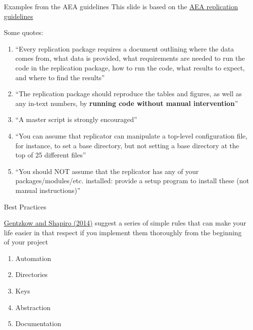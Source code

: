 \documentclass[10pt, aspectratio=169, xcolor=dvipsnames]{beamer}
\let\olditem\item
\renewcommand{\item}{%
\olditem\vspace{0.3em}}
\begin{document}
\begin{frame}[t]{Examples from the AEA guidelines}
    \footnotesize This slide is based on the \href{https://aeadataeditor.github.io/aea-de-guidance/preparing-for-data-deposit.html}{AEA replication guidelines}

    \normalsize\vspace{0.5em} Some quotes: 
    \begin{enumerate}
        \item ``Every replication package requires a document outlining where the data comes from, what data is provided, what requirements are needed to run the code in the replication package, how to run the code, what results to expect, and where to find the results''
        \item ``The replication package should reproduce the tables and figures, as well as any in-text numbers, by \textbf{running code without manual intervention}''
        \item ``A master script is strongly encouraged''
        \item ``You can assume that replicator can manipulate a top-level configuration file, for instance, to set a base directory, but not setting a base directory at the top of 25 different files''
        \item ``You should NOT assume that the replicator has any of your packages/modules/etc. installed: provide a setup program to install these (not manual instructions)''
    \end{enumerate}
\end{frame}

\begin{frame}[t]{Best Practices}

    \normalsize\vspace{0.5em} \href{https://web.stanford.edu/~gentzkow/research/CodeAndData.pdf}{Gentzkow and Shapiro (2014)} suggest a series of simple rules that can make your life easier in that respect if you implement them thoroughly from the beginning of your project
    \begin{enumerate}
        \item \alert{Automation}
        \item \alert{Directories}
        \item \alert{Keys}
        \item \alert{Abstraction}
        \item \alert{Documentation}
    \end{enumerate}
\end{frame}
\end{document}
